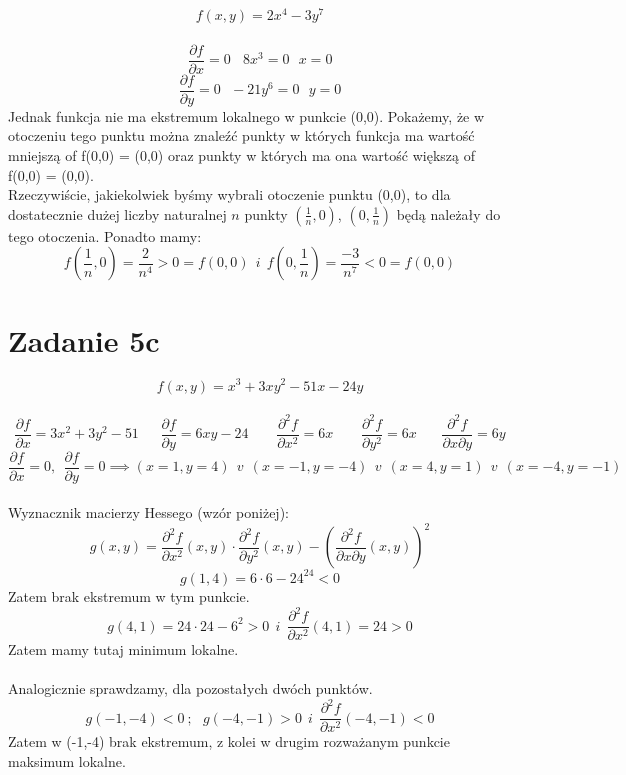 \documentclass{article}
\begin{document}
$$f(x,y) = 2x^4 - 3y^7$$ \\
$$\frac{\partial f}{\partial x} = 0 \ \ \ \ 8x^3 = 0 \ \ \ x = 0$$
$$\frac{\partial f}{\partial y} = 0 \ \ \ -21y^6 = 0 \ \ \ y = 0$$
Jednak funkcja nie ma ekstremum lokalnego w punkcie (0,0). Pokażemy, że w otoczeniu tego punktu można znaleźć punkty w których funkcja ma wartość mniejszą of f(0,0) = (0,0) oraz punkty w których ma ona wartość większą of f(0,0) = (0,0). \\
Rzeczywiście, jakiekolwiek byśmy wybrali otoczenie punktu (0,0), to dla dostatecznie dużej liczby naturalnej $n$ punkty $(\frac{1}{n},0)$, $(0,\frac{1}{n})$ będą należały do tego otoczenia. Ponadto mamy:
$$f(\frac{1}{n},0) = \frac{2}{n^4} > 0 = f(0,0) \ \ i \ \ f(0,\frac{1}{n}) = \frac{-3}{n^7} < 0 = f(0,0)$$


\section*{Zadanie 5c}

$$f(x,y) = x^3 + 3xy^2-51x-24y$$ \\
$$\frac{\partial f}{\partial x} = 3x^2 + 3y^2 -51 \ \ \ \ \ \ \ \frac{\partial f}{\partial y} = 6xy - 24 \ \ \ \ \ \ \ \ \ \frac{\partial^2 f}{\partial x^2} = 6x\ \ \ \ \ \ \ \ \ \frac{\partial^2 f}{\partial y^2} = 6x \ \ \ \ \ \ \ \ \frac{\partial^2 f}{\partial x \partial y} = 6y$$
$$\frac{\partial f}{\partial x} = 0, \ \ \frac{\partial f}{\partial y} = 0 \implies (x = 1, y = 4) \ \ v \ \ (x = -1, y = -4) \ \ v \ \ (x = 4, y = 1) \ \ v \ \ (x = -4, y = -1)$$ \\
Wyznacznik macierzy Hessego (wzór poniżej):
$$g(x,y) = \frac{\partial^2 f}{\partial x^2}(x,y) \cdot \frac{\partial^2 f}{\partial y^2}(x,y) - (\frac{\partial^2 f}{\partial x \partial y}(x,y))^2$$
$$g(1,4) = 6 \cdot 6 - 24^{24} < 0$$
Zatem brak ekstremum w tym punkcie. 
$$g(4,1) = 24 \cdot 24 - 6^2 > 0 \ \ i \ \ \frac{\partial^2 f}{\partial x^2}(4,1) = 24 > 0$$
Zatem mamy tutaj minimum lokalne. \\ \\
Analogicznie sprawdzamy, dla pozostałych dwóch punktów.
$$g(-1,-4) < 0 \ ; \ \ \ g(-4,-1) > 0 \ \ i \ \ \frac{\partial^2 f}{\partial x^2}(-4,-1) < 0$$
Zatem w (-1,-4) brak ekstremum, z kolei w drugim rozważanym punkcie maksimum lokalne.
\end{document}
